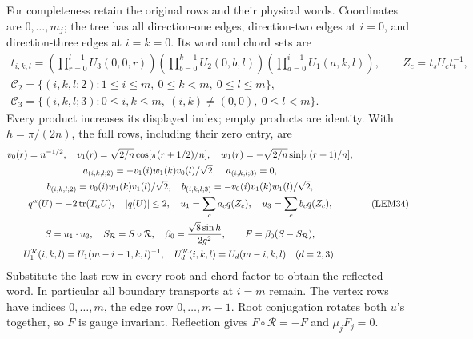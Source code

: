 \documentclass[11pt]{article}
\begin{document}
For completeness retain the original rows and their physical words. Coordinates are \(0,\ldots,m_j\); the tree has all direction-one edges, direction-two edges at \(i=0\), and direction-three edges at \(i=k=0\). Its word and chord sets are
\[
\begin{gathered}
t_{i,k,l}=\left(\prod_{r=0}^{l-1}U_3(0,0,r)\right)
 \left(\prod_{b=0}^{k-1}U_2(0,b,l)\right)
 \left(\prod_{a=0}^{i-1}U_1(a,k,l)\right),\qquad
 Z_c=t_sU_ct_t^{-1},\\
\mathcal C_2=\{(i,k,l;2):1\le i\le m,\ 0\le k<m,\ 0\le l\le m\},\\
\mathcal C_3=\{(i,k,l;3):0\le i,k\le m,\ (i,k)\ne(0,0),\ 0\le l<m\}.
\end{gathered}\tag{LEM33}
\]
Every product increases its displayed index; empty products are identity. With \(h=\pi/(2n)\), the full rows, including their zero entry, are
\[
\begin{gathered}
v_0(r)=n^{-1/2},\quad v_1(r)=\sqrt{2/n}\cos[\pi(r+1/2)/n],
\quad w_1(r)=-\sqrt{2/n}\sin[\pi(r+1)/n],\\
a_{(i,k,l;2)}=-v_1(i)w_1(k)v_0(l)/\sqrt2,\quad a_{(i,k,l;3)}=0,\\
b_{(i,k,l;2)}=v_0(i)w_1(k)v_1(l)/\sqrt2,\quad
b_{(i,k,l;3)}=-v_0(i)v_1(k)w_1(l)/\sqrt2,\\
q^\alpha(U)=-2\operatorname{tr}(T_\alpha U),\quad |q(U)|\le2,\quad
u_1=\sum_ca_cq(Z_c),\quad u_3=\sum_cb_cq(Z_c),\\
S=u_1\cdot u_3,\quad S_{\mathcal R}=S\circ\mathcal R,\quad
\beta_0={\sqrt8\sin h\over2g^2},\qquad F=\beta_0(S-S_{\mathcal R}),\\
U_1^{\mathcal R}(i,k,l)=U_1(m-i-1,k,l)^{-1},\quad
U_d^{\mathcal R}(i,k,l)=U_d(m-i,k,l)\quad(d=2,3).
\end{gathered}\tag{LEM34}
\]
Substitute the last row in every root and chord factor to obtain the reflected word. In particular all boundary transports at \(i=m\) remain. The vertex rows have indices \(0,\ldots,m\), the edge row \(0,\ldots,m-1\). Root conjugation rotates both \(u\)'s together, so \(F\) is gauge invariant. Reflection gives \(F\circ\mathcal R=-F\) and \(\mu_jF_j=0\).
\end{document}
